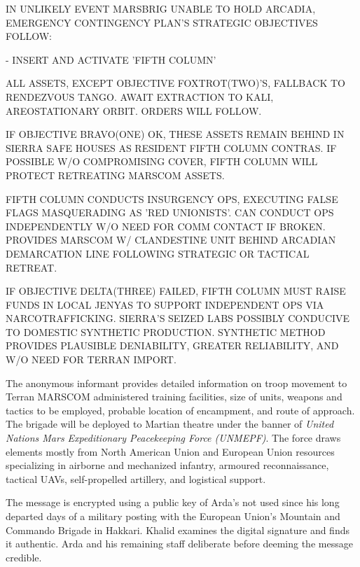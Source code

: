 IN UNLIKELY EVENT MARSBRIG UNABLE TO HOLD ARCADIA, EMERGENCY CONTINGENCY PLAN'S STRATEGIC OBJECTIVES FOLLOW:
\startitemize[4]
\item {} - INSERT AND ACTIVATE 'FIFTH COLUMN'

    \startitemize[n]
    \item ALL ASSETS, EXCEPT OBJECTIVE FOXTROT(TWO)'S, FALLBACK TO RENDEZVOUS TANGO. AWAIT EXTRACTION TO KALI, AREOSTATIONARY ORBIT. ORDERS WILL FOLLOW.

    \item IF OBJECTIVE BRAVO(ONE) OK, THESE ASSETS REMAIN BEHIND IN SIERRA SAFE HOUSES AS RESIDENT FIFTH COLUMN CONTRAS. IF POSSIBLE W/O COMPROMISING COVER, FIFTH COLUMN WILL PROTECT RETREATING MARSCOM ASSETS.

    \item FIFTH COLUMN CONDUCTS INSURGENCY OPS, EXECUTING FALSE FLAGS MASQUERADING AS 'RED UNIONISTS'. CAN CONDUCT OPS INDEPENDENTLY W/O NEED FOR COMM CONTACT IF BROKEN. PROVIDES MARSCOM W/ CLANDESTINE UNIT BEHIND ARCADIAN DEMARCATION LINE FOLLOWING STRATEGIC OR TACTICAL RETREAT.

    \item IF OBJECTIVE DELTA(THREE) FAILED, FIFTH COLUMN MUST RAISE FUNDS IN LOCAL JENYAS TO SUPPORT INDEPENDENT OPS VIA NARCOTRAFFICKING. SIERRA'S SEIZED LABS POSSIBLY CONDUCIVE TO DOMESTIC SYNTHETIC PRODUCTION. SYNTHETIC METHOD PROVIDES PLAUSIBLE DENIABILITY, GREATER RELIABILITY, AND W/O NEED FOR TERRAN IMPORT.
    \stopitemize
\stopitemize
\stopTimelineCorrespondenceDocument

The anonymous informant provides detailed information on troop movement to Terran MARSCOM administered training facilities, size of units, weapons and tactics to be employed, probable location of encampment, and route of approach. The brigade will be deployed to Martian theatre under the banner of {\it United Nations Mars Expeditionary Peacekeeping Force (UNMEPF)}. The force draws elements mostly from North American Union and European Union resources specializing in airborne and mechanized infantry, armoured reconnaissance, tactical UAVs, self-propelled artillery, and logistical support.

The message is encrypted using a public key of Arda's not used since his long departed days of a military posting with the European Union's Mountain and Commando Brigade in Hakkari. Khalid examines the digital signature and finds it authentic. Arda and his remaining staff deliberate before deeming the message credible.
\StopTimelineDate

